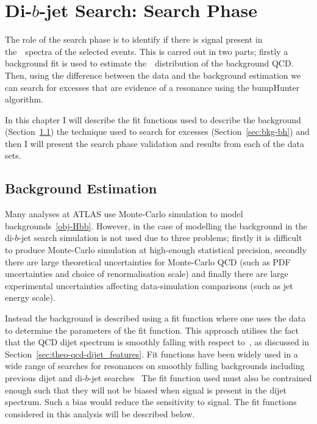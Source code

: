 \chapter{Di-$b$-jet Search: Search Phase}
\label{sec:bkg}

The role of the search phase is to identify
if there is signal present in the~\mjj~spectra
of the selected events.
This is carred out in two parts;
firstly a background fit is used to estimate
the~\mjj~distribution of the background QCD.
Then, using the difference between the data
and the background estimation we can search
for excesses that are evidence of a resonance
using the bumpHunter algorithm.

In this chapter I will describe
the fit functions used to describe the background
(Section~\ref{sec:bkg-fit})
the technique used to search for excesses
(Section~\ref{sec:bkg-bh})
and then I will present the search phase
validation and results from each of the data sets.

\section{Background Estimation}
\label{sec:bkg-fit}

Many analyses at ATLAS use Monte-Carlo simulation
to model backgrounds~\ref{obj-Hbb}.
However, in the case of modelling the background in the di-$b$-jet search
simulation is not used due to three problems;
firstly it is difficult to produce Monte-Carlo simulation at high-enough statistical precision,
secondly there are large theoretical uncertainties for Monte-Carlo QCD
(such as PDF uncertainties and choice of renormalisation scale)
and finally there are large experimental uncertainties affecting
data-simulation comparisons (such as jet energy scale).

Instead the background is described using a fit function
where one uses the data to determine the parameters of the fit function.
This approach utilises the fact that the QCD dijet spectrum
is smoothly falling with respect to~\mjj,
as discussed in Section~\ref{sec:theo-qcd-dijet_features}.
Fit functions have been widely used
in a wide range of searches for resonances on smoothly falling backgrounds
including previous dijet and di-$b$-jet searches~\cite{}
The fit function used must also be contrained enough
such that they will not be biased when signal is present in the dijet spectrum.
Such a bias would reduce the sensitivity to signal.
The fit functions considered in this analysis will be described below.

